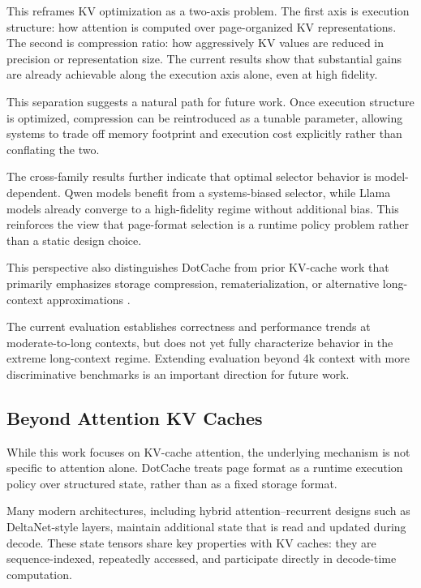 \documentclass[11pt]{article}
\begin{document}
This reframes KV optimization as a two-axis problem. The first axis is execution structure: how attention is computed over page-organized KV representations. The second is compression ratio: how aggressively KV values are reduced in precision or representation size. The current results show that substantial gains are already achievable along the execution axis alone, even at high fidelity.

This separation suggests a natural path for future work. Once execution structure is optimized, compression can be reintroduced as a tunable parameter, allowing systems to trade off memory footprint and execution cost explicitly rather than conflating the two.

The cross-family results further indicate that optimal selector behavior is model-dependent. Qwen models benefit from a systems-biased selector, while Llama models already converge to a high-fidelity regime without additional bias. This reinforces the view that page-format selection is a runtime policy problem rather than a static design choice.

This perspective also distinguishes DotCache from prior KV-cache work that primarily emphasizes storage compression, rematerialization, or alternative long-context approximations \cite{kvquant,kivi,qjl,polarquant,turboquant,innerq,pqcache,xquant,streamingllm}.

The current evaluation establishes correctness and performance trends at moderate-to-long contexts, but does not yet fully characterize behavior in the extreme long-context regime. Extending evaluation beyond 4k context with more discriminative benchmarks is an important direction for future work.

\subsection{Beyond Attention KV Caches}

While this work focuses on KV-cache attention, the underlying mechanism is not specific to attention alone. DotCache treats page format as a runtime execution policy over structured state, rather than as a fixed storage format.

Many modern architectures, including hybrid attention–recurrent designs such as DeltaNet-style layers, maintain additional state that is read and updated during decode. These state tensors share key properties with KV caches: they are sequence-indexed, repeatedly accessed, and participate directly in decode-time computation.
\end{document}
